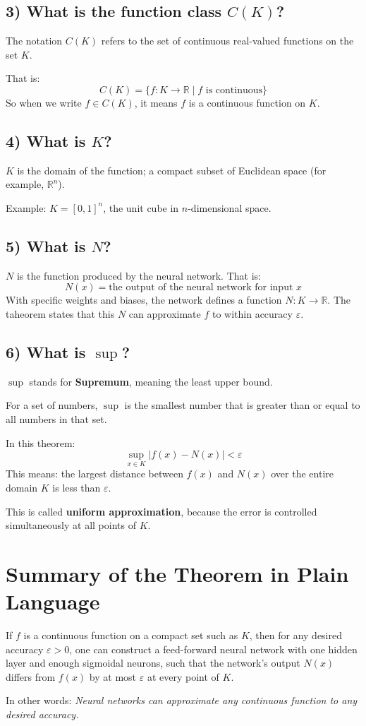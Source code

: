 \documentclass{article}
\begin{document}
\subsection*{3) What is the function class \( C(K) \)?}
The notation \( C(K) \) refers to the set of continuous real-valued functions on the set \( K \).

That is:
\[
C(K) = \{ f : K \to \mathbb{R} \mid f \text{ is continuous} \}
\]
So when we write \( f \in C(K) \), it means \( f \) is a continuous function on \( K \).

\subsection*{4) What is \( K \)?}
\( K \) is the domain of the function; a compact subset of Euclidean space (for example, \( \mathbb{R}^n \)).

Example: \( K = [0,1]^n \), the unit cube in \( n \)-dimensional space.

\subsection*{5) What is \( N \)?}
\( N \) is the function produced by the neural network. That is:
\[
N(x) = \text{the output of the neural network for input } x
\]
With specific weights and biases, the network defines a function \( N : K \to \mathbb{R} \). The taheorem states that this \( N \) can approximate \( f \) to within accuracy \( \varepsilon \).

\subsection*{6) What is \( \sup \)?}
\( \sup \) stands for \textbf{Supremum}, meaning the least upper bound.

For a set of numbers, \( \sup \) is the smallest number that is greater than or equal to all numbers in that set.

In this theorem:
\[
\sup_{x \in K} \left| f(x) - N(x) \right| < \varepsilon
\]
This means: the largest distance between \( f(x) \) and \( N(x) \) over the entire domain \( K \) is less than \( \varepsilon \).

This is called \textbf{uniform approximation}, because the error is controlled simultaneously at all points of \( K \).

\section*{Summary of the Theorem in Plain Language}

If \( f \) is a continuous function on a compact set such as \( K \), then for any desired accuracy \( \varepsilon > 0 \), one can construct a feed-forward neural network with one hidden layer and enough sigmoidal neurons, such that the network's output \( N(x) \) differs from \( f(x) \) by at most \( \varepsilon \) at every point of \( K \).

In other words: \textit{Neural networks can approximate any continuous function to any desired accuracy.}
\end{document}

